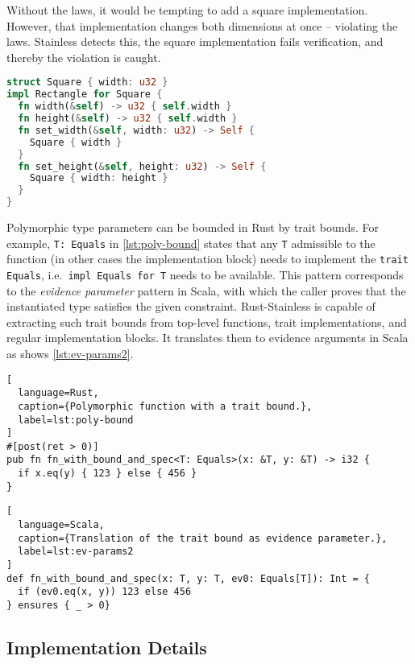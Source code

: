 Without the laws, it would be tempting to add a square implementation.
However, that implementation changes both dimensions at once --
violating the laws. Stainless detects this, the square implementation
fails verification, and thereby the violation is caught.

\begin{lstlisting}[language=Rust, caption={Example implementation violating the laws.}]
struct Square { width: u32 }
impl Rectangle for Square {
  fn width(&self) -> u32 { self.width }
  fn height(&self) -> u32 { self.width }
  fn set_width(&self, width: u32) -> Self {
    Square { width }
  }
  fn set_height(&self, height: u32) -> Self {
    Square { width: height }
  }
}
\end{lstlisting}

Polymorphic type parameters can be bounded in Rust by trait bounds. For example,
\lstinline!T: Equals! in \autoref{lst:poly-bound} states that any \lstinline!T!
admissible to the function (in other cases the implementation block) needs to
implement the \passthrough{\lstinline!trait Equals!},
i.e.~\lstinline!impl Equals for T! needs to be available. This pattern
corresponds to the \emph{evidence parameter} pattern in Scala, with which the
caller proves that the instantiated type satisfies the given constraint.
Rust-Stainless is capable of extracting such trait bounds from top-level
functions, trait implementations, and regular implementation blocks. It
translates them to evidence arguments in Scala as shows \autoref{lst:ev-params2}.

\begin{lstlisting}[
  language=Rust,
  caption={Polymorphic function with a trait bound.},
  label=lst:poly-bound
]
#[post(ret > 0)]
pub fn fn_with_bound_and_spec<T: Equals>(x: &T, y: &T) -> i32 {
  if x.eq(y) { 123 } else { 456 }
}
\end{lstlisting}

\begin{lstlisting}[
  language=Scala,
  caption={Translation of the trait bound as evidence parameter.},
  label=lst:ev-params2
]
def fn_with_bound_and_spec(x: T, y: T, ev0: Equals[T]): Int = {
  if (ev0.eq(x, y)) 123 else 456
} ensures { _ > 0}
\end{lstlisting}

\begin{quote}
\end{quote}



\subsection{Implementation Details}

